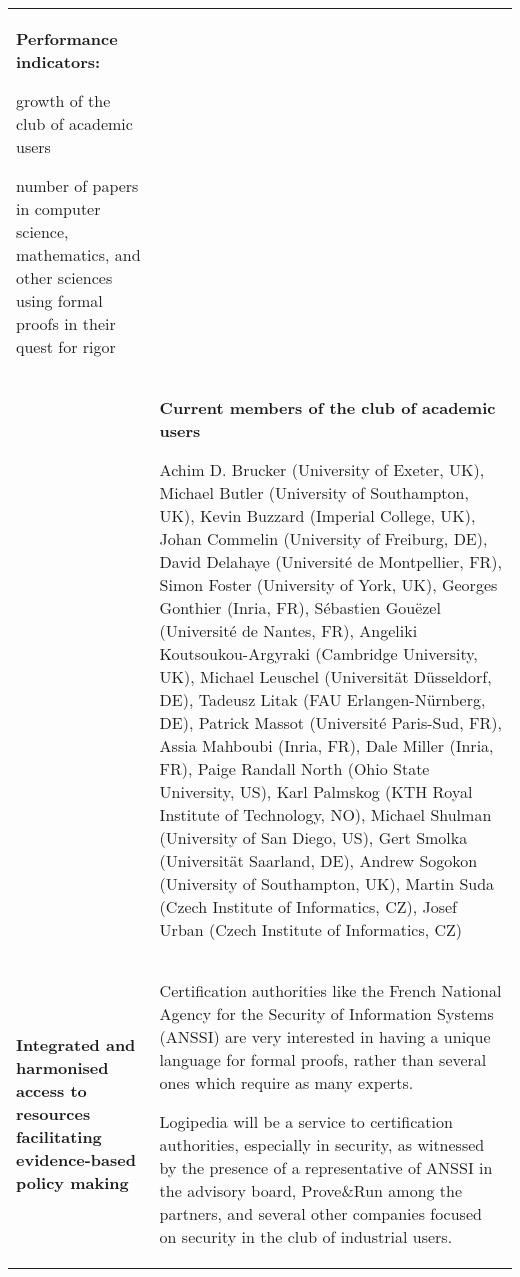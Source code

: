 \begin{longtable}{|p{}|p{}|}
\colorbox{color3}{\bf Performance indicators:}
\begin{compactitem}
\item growth of the club of academic users
\item number of papers in computer science, mathematics, and other sciences
using formal proofs in their quest for rigor
\end{compactitem}
\\
&
\definecolor{shadecolor}{named}{color1}
\begin{shaded}
\begin{center}
  {\bf\large Current members of the club of academic users}
\end{center}
Achim D. Brucker (University of Exeter, UK),
Michael Butler (University of Southampton, UK),
Kevin Buzzard (Imperial College, UK),
Johan Commelin (University of Freiburg, DE),
David Delahaye (Université de Montpellier, FR),
Simon Foster (University of York, UK),
Georges Gonthier (Inria, FR),
Sébastien Gouëzel (Université de Nantes, FR),
Angeliki Koutsoukou-Argyraki (Cambridge University, UK),
Michael Leuschel (Universität Düsseldorf, DE),
Tadeusz Litak (FAU Erlangen-Nürnberg, DE),
Patrick Massot (Université Paris-Sud, FR),
Assia Mahboubi (Inria, FR),
Dale Miller (Inria, FR),
Paige Randall North (Ohio State University, US),
Karl Palmskog (KTH Royal Institute of Technology, NO),
Michael Shulman (University of San Diego, US),
Gert Smolka (Universität Saarland, DE),
Andrew Sogokon (University of Southampton, UK),
Martin Suda (Czech Institute of Informatics, CZ),
Josef Urban (Czech Institute of Informatics, CZ)
\end{shaded}
\\
\hline
{\bf Integrated and harmonised access to resources facilitating evidence-based policy making}
&
Certification authorities like the French National Agency for the
Security of Information Systems (ANSSI) are very interested in having
a unique language for formal proofs, rather than several ones which
require as many experts.

Logipedia will be a service to
certification authorities, especially in security, as witnessed by the
presence of a representative of ANSSI in the advisory board,
Prove\&Run among the partners, and several other companies focused on
security in the club of industrial users.


\end{longtable}
